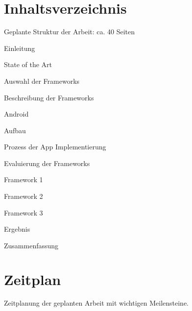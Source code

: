 \documentclass[a4paper,11pt,german,public]{INSOexpose}
\begin{document}
\section{Inhaltsverzeichnis}
Geplante Struktur der Arbeit: ca. 40 Seiten	
\begin{samepage}
  \begin{contentstructure}
    \item Einleitung	
    \item State of the Art 
    \begin{contentstructure}
      \item Auswahl der Frameworks 
      \item Beschreibung der Frameworks 
    \end{contentstructure}
    \item Android 
    \begin{contentstructure}
      \item Aufbau 
      \item Prozess der App Implementierung 
    \end{contentstructure}
    \item Evaluierung der Frameworks 
    \begin{contentstructure}
      \item Framework 1	
      \item Framework 2 
      \item Framework 3 
    \end{contentstructure}
    \item Ergebnis 
    \item Zusammenfassung 
  \end{contentstructure}
\end{samepage}

\section{Zeitplan}
Zeitplanung der geplanten Arbeit mit wichtigen Meilensteine.
\end{document}
